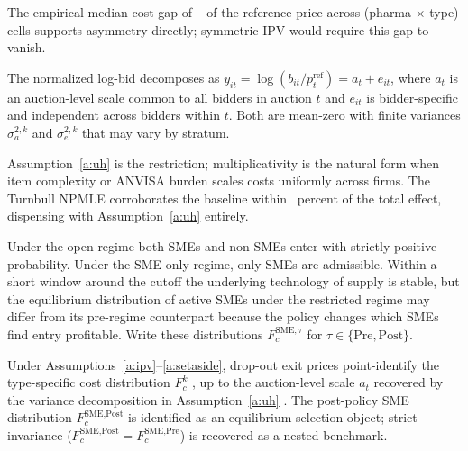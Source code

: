 The empirical median-cost gap of \medCostGapLo--\medCostGapHi{} of the reference price across (pharma $\times$ type) cells supports asymmetry directly; symmetric IPV would require this gap to vanish.

\begin{assumption}\label{a:uh}
The normalized log-bid decomposes as $y_{it} = \log(b_{it} / p_t^{\mathrm{ref}}) = a_t + e_{it}$, where $a_t$ is an auction-level scale common to all bidders in auction $t$ and $e_{it}$ is bidder-specific and independent across bidders within $t$. Both are mean-zero with finite variances $\sigma_a^{2,k}$ and $\sigma_e^{2,k}$ that may vary by stratum.
\end{assumption}

Assumption~\ref{a:uh} is the \citet{krasnokutskaya2011} restriction; multiplicativity is the natural form when item complexity or ANVISA burden scales costs uniformly across firms. The Turnbull NPMLE corroborates the baseline within \turnbullDeviationPct~percent of the total effect, dispensing with Assumption~\ref{a:uh} entirely.

\begin{assumption}\label{a:setaside}
Under the open regime both SMEs and non-SMEs enter with strictly positive probability. Under the SME-only regime, only SMEs are admissible. Within a short window around the cutoff the underlying technology of supply is stable, but the equilibrium distribution of active SMEs under the restricted regime may differ from its pre-regime counterpart because the policy changes which SMEs find entry profitable. Write these distributions $F_c^{\text{SME},\tau}$ for $\tau \in \{\text{Pre},\text{Post}\}$.
\end{assumption}

\begin{proposition}\label{prop:identification}
Under Assumptions~\ref{a:ipv}--\ref{a:setaside}, drop-out exit prices point-identify the type-specific cost distribution $F_c^k$ \citep{haile2003}, up to the auction-level scale $a_t$ recovered by the variance decomposition in Assumption~\ref{a:uh} \citep{krasnokutskaya2011}. The post-policy SME distribution $F_c^{\text{SME,Post}}$ is identified as an equilibrium-selection object; strict invariance ($F_c^{\text{SME,Post}} = F_c^{\text{SME,Pre}}$) is recovered as a nested benchmark.
\end{proposition}

